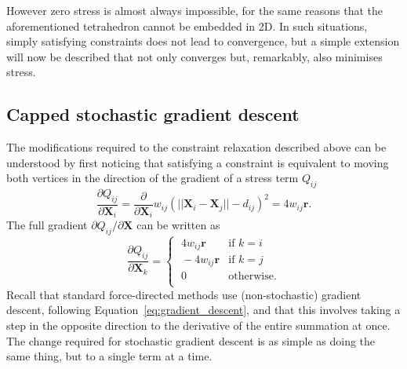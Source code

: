 However zero stress is almost always impossible, for the same reasons that the aforementioned tetrahedron cannot be embedded in 2D. In such situations, simply satisfying constraints does not lead to convergence, but a simple extension will now be described that not only converges but, remarkably, also minimises stress.

\subsection{Capped stochastic gradient descent}
\label{sec:sgd_description}
The modifications required to the constraint relaxation described above can be understood by first noticing that satisfying a constraint is equivalent to moving both vertices in the direction of the gradient of a stress term $Q_{ij}$
\begin{equation}
  \label{gradient}
  \frac{\partial Q_{ij}}{\partial\mathbf{X}_i}=\frac{\partial}{\partial\mathbf{X}_i}w_{ij}(||\mathbf{X}_i - \mathbf{X}_j|| - d_{ij})^2 = 4w_{ij}\mathbf{r}.
\end{equation}
The full gradient $\partial Q_{ij}/\partial\mathbf{X}$ can be written as
\begin{equation}
  \frac{\partial Q_{ij}}{\partial\mathbf{X}_k}=
  \begin{cases}
    \;4w_{ij}\mathbf{r} & \mbox{if $k=i$} \\
    \;-4w_{ij}\mathbf{r} & \mbox{if $k=j$} \\
    \;0 & \mbox{otherwise.} \\
  \end{cases}
\end{equation}
Recall that standard force-directed methods use (non-stochastic) gradient descent, following Equation~\eqref{eq:gradient_descent}, and that this involves taking a step in the opposite direction to the derivative of the entire summation at once.
The change required for stochastic gradient descent is as simple as doing the same thing, but to a single term at a time.


